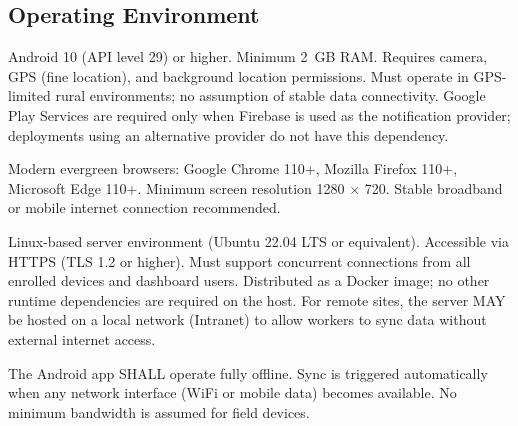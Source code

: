 \documentclass[12pt, a4paper]{article}
\begin{document}
\subsection{Operating Environment}
\begin{description}[leftmargin=3.5cm, style=nextline]
    \item[Android App]
        Android 10 (API level 29) or higher. Minimum 2~GB RAM. Requires
        camera, GPS (fine location), and background location permissions.
        Must operate in GPS-limited rural environments; no assumption of
        stable data connectivity. Google Play Services are required only
        when Firebase is used as the notification provider; deployments
        using an alternative provider do not have this dependency.

    \item[Web Dashboard]
        Modern evergreen browsers: Google Chrome 110+, Mozilla Firefox 110+,
        Microsoft Edge 110+. Minimum screen resolution 1280 $\times$ 720.
        Stable broadband or mobile internet connection recommended.

    \item[Backend Server]
        Linux-based server environment (Ubuntu 22.04 LTS or equivalent).
        Accessible via HTTPS (TLS 1.2 or higher). Must support concurrent
        connections from all enrolled devices and dashboard users.
        Distributed as a Docker image; no other runtime dependencies are
        required on the host. For remote sites, the server MAY be hosted on a local network (Intranet) to allow workers to sync data without external internet access.

    \item[Network]
        The Android app SHALL operate fully offline. Sync is triggered
        automatically when any network interface (WiFi or mobile data)
        becomes available. No minimum bandwidth is assumed for field
        devices.
\end{description}
\end{document}
